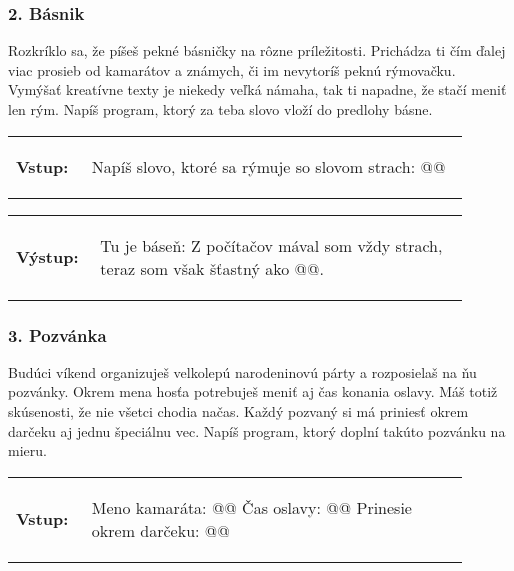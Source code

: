 \subsubsection*{2. Básnik}
Rozkríklo sa, že píšeš pekné básničky na rôzne príležitosti. Prichádza ti čím ďalej viac prosieb od kamarátov a známych, či im nevytoríš peknú rýmovačku. Vymýšať kreatívne texty je niekedy veľká námaha, tak ti napadne, že stačí meniť len rým. Napíš program, ktorý za teba slovo vloží do predlohy básne.

\begin{tabular}{@{}p{0.15\linewidth}p{0.75\linewidth}}
\textbf{\small Vstup:} &
\vspace{-3em}
\begin{code}
Napíš slovo, ktoré sa rýmuje so slovom strach: @\fbox{\phantom{slovo}}@
\end{code}
\end{tabular}

\vspace{-2em}
\begin{tabular}{@{}p{0.15\linewidth}p{0.75\linewidth}}
\textbf{\small Výstup:} &
\vspace{-3em} 
\begin{code}
Tu je báseň:
Z počítačov mával som vždy strach,
teraz som však šťastný ako @\fbox{\phantom{slovo}}@.
\end{code}
\end{tabular}
\vspace{-2em}

\subsubsection*{3. Pozvánka}
Budúci víkend organizuješ velkolepú narodeninovú párty a rozposielaš na ňu pozvánky. Okrem mena hosťa potrebuješ meniť aj čas konania oslavy. Máš totiž skúsenosti, že nie všetci chodia načas. Každý pozvaný si má priniesť okrem darčeku aj jednu špeciálnu vec. Napíš program, ktorý doplní takúto pozvánku na mieru.

\begin{tabular}{@{}p{0.15\linewidth}p{0.75\linewidth}}
\textbf{\small Vstup:} &
\vspace{-3em}
\begin{code}
Meno kamaráta: @\fbox{\phantom{vstup}}@
Čas oslavy: @\fbox{\phantom{vstup}}@
Prinesie okrem darčeku: @\fbox{\phantom{vstup}}@
\end{code}
\end{tabular}

